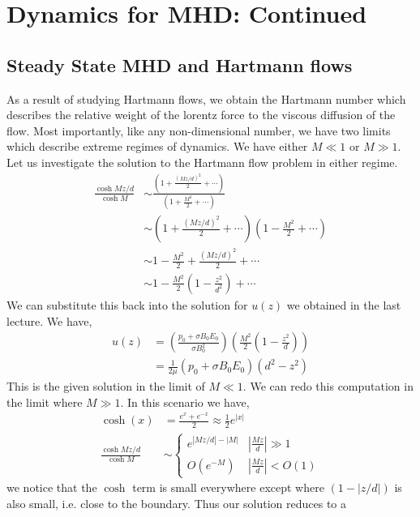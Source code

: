 \documentclass{article}
\begin{document}
\section{Dynamics for MHD: Continued}
\subsection{Steady State MHD and Hartmann flows}
    As a result of studying Hartmann flows, we obtain the Hartmann number
    which describes the relative weight of the lorentz force to the viscous
    diffusion of the flow. Most importantly, like any non-dimensional number,
    we have two limits which describe extreme regimes of dynamics. We have
    either $M \ll 1$ or $M\gg 1$. Let us investigate the solution to the
    Hartmann flow problem in either regime. 
\begin{align*}
    \frac{\cosh{Mz/d}}{\cosh{M}} &\sim \frac{\left(1 + \frac{(Mz/d)^2}{2} +
    \cdots\right)}{\left(1 + \frac{M^2}{2} + \cdots\right)}\\
    &\sim \left(1 + \frac{(Mz/d)^2}{2} +
    \cdots\right)\left(1 - \frac{M^2}{2} + \cdots\right)\\
    &\sim 1 - \frac{M^2}{2} + \frac{(Mz/d)^2}{2} + \cdots\\
    &\sim 1 - \frac{M^2}{2}\left(1 - \frac{z^2}{d^2}\right) + \cdots
\end{align*}
We can substitute this back into the solution for $u(z)$ we obtained in the last
lecture. We have, 
\begin{align*}
    u(z) &= \left(\frac{p_0 + \sigma B_0E_0}{\sigma
    B_0^2}\right)\left(\frac{M^2}{2}\left(1 - \frac{z^2}{d}\right)\right)\\
    &= \frac{1}{2\mu}\left(p_0 + \sigma B_0E_0\right) \left(d^2-z^2\right)
\end{align*}
This is the given solution in the limit of $M \ll 1$. We can redo this
computation in the limit where $M \gg 1$. In this scenario we have, 
\begin{align*}
    \cosh(x) &= \frac{e^x + e^{-x}}{2} \approx \frac{1}{2}e^{|x|}\\
    \frac{\cosh{Mz/d}}{\cosh{M}} &\sim \begin{cases} e^{|Mz/d| - |M|} &
    \left|\frac{Mz}{d}\right| \gg 1\\O(e^{-M}) &
    \left|\frac{Mz}{d}\right| < O(1)\end{cases}
\end{align*}
we notice that the $\cosh$ term is small everywhere except where $(1 - |z/d|)$
is also small, i.e. close to the boundary. Thus our solution reduces to a
\end{document}
